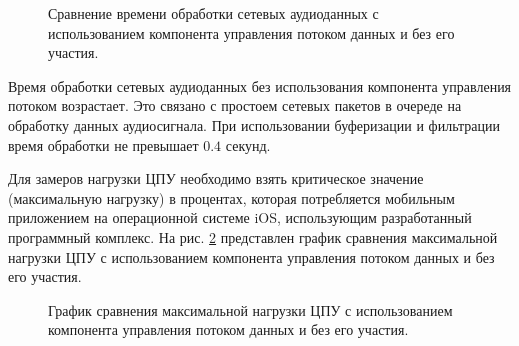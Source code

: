     \begin{figure}[!h]
        \caption{
            Сравнение времени обработки сетевых аудиоданных
            с использованием компонента управления потоком данных и без его участия.
        }
        \label{fig:time-throttler}
    \end{figure}

    \par Время обработки сетевых аудиоданных без использования компонента управления потоком возрастает.
    Это связано с простоем сетевых пакетов в очереде на обработку данных аудиосигнала.
    При использовании буферизации и фильтрации время обработки не превышает $0.4$ секунд.

    \par Для замеров нагрузки ЦПУ необходимо взять критическое значение (максимальную нагрузку) в процентах,
    которая потребляется мобильным приложением на операционной системе iOS, использующим разработанный программный комплекс.
    На рис. \ref{fig:cpu-throttler} представлен график сравнения максимальной нагрузки ЦПУ 
    с использованием компонента управления потоком данных и без его участия.
    \begin{figure}[!h]
        \caption{
            График сравнения максимальной нагрузки ЦПУ 
            с использованием компонента управления потоком данных и без его участия.
        }
        \label{fig:cpu-throttler}
    \end{figure}

